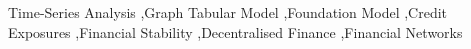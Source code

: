 \documentclass[preprint,12pt]{elsarticle}
\begin{document}
\begin{frontmatter}
\begin{keyword}
Time-Series Analysis \sep Graph Tabular Model \sep Foundation Model \sep Credit Exposures \sep Financial Stability \sep Decentralised Finance \sep Financial Networks





\end{keyword}

\end{frontmatter}


\newpage
\tableofcontents





\end{document}

